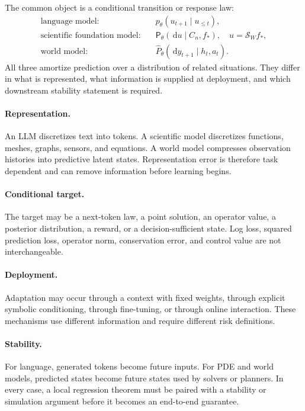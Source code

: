 \documentclass[11pt]{amsart}
\numberwithin{equation}{section}
\theoremstyle{definition}
\theoremstyle{plain}
\theoremstyle{remark}
\newcommand{\cS}{\mathcal{S}}
\newcommand{\dd}{\,\mathrm{d}}
\begin{document}
The common object is a conditional transition or response law:
\begin{equation}\label{eq:three-laws}
\begin{aligned}
\text{language model:}\quad
&p_\theta(u_{t+1}\mid u_{\le t}),\\
\text{scientific foundation model:}\quad
&\mathsf P_\theta(\dd u\mid C_n,f_*),
\quad u=\cS_Wf_*,\\
\text{world model:}\quad
&\widehat P_\theta(\dd y_{t+1}\mid h_t,a_t).
\end{aligned}
\end{equation}
All three amortize prediction over a distribution of related situations.  They
differ in what is represented, what information is supplied at deployment,
and which downstream stability statement is required.

\paragraph{\textbf{Representation.}}
An LLM discretizes text into tokens.  A scientific model discretizes functions,
meshes, graphs, sensors, and equations.  A world model compresses observation
histories into predictive latent states.  Representation error is therefore
task dependent and can remove information before learning begins.

\paragraph{\textbf{Conditional target.}}
The target may be a next-token law, a point solution, an operator value, a
posterior distribution, a reward, or a decision-sufficient state.  Log loss,
squared prediction loss, operator norm, conservation error, and control value
are not interchangeable.

\paragraph{\textbf{Deployment.}}
Adaptation may occur through a context with fixed weights, through explicit
symbolic conditioning, through fine-tuning, or through online interaction.
These mechanisms use different information and require different risk
definitions.

\paragraph{\textbf{Stability.}}
For language, generated tokens become future inputs.  For PDE and world models,
predicted states become future states used by solvers or planners.  In every
case, a local regression theorem must be paired with a stability or simulation
argument before it becomes an end-to-end guarantee.
\end{document}
